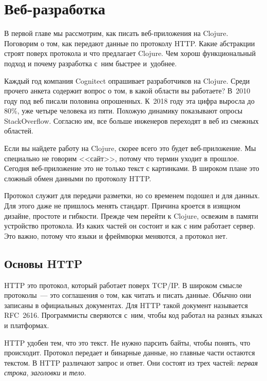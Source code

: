 \chapter{Веб-разработка}

\begin{teaser}
В первой главе мы рассмотрим, как писать веб-приложения на Clojure. Поговорим о
том, как передают данные по протоколу HTTP. Какие абстракции строят поверх
протокола и что предлагает Clojure. Чем хорош функциональный подход и почему
разработка с~ним быстрее и~удобнее.
\end{teaser}

Каждый год компания Cognitect
опрашивает
разработчиков на Clojure. Среди прочего анкета содержит вопрос о том, в какой
области вы работаете? В~2010 году под веб писали половина опрошенных. К~2018
году эта цифра выросла до 80\%, уже четыре человека из пяти. Похожую динамику
показывают опросы
StackOverflow. Согласно
им, все больше инженеров переходят в веб из смежных областей.

Если вы найдете работу на Clojure, скорее всего это будет веб-приложение. Мы
специально не говорим <<сайт>>, потому что термин уходит в прошлое. Сегодня
веб-приложение это не только текст с картинками. В широком плане это сложный
обмен данными по протоколу HTTP.

Протокол служит для передачи разметки, но со временем подошел и для данных. Для
этого даже не пришлось менять стандарт. Причина кроется в изящном дизайне,
простоте и гибкости. Прежде чем перейти к Clojure, освежим в памяти устройство
протокола. Из каких частей он состоит и как с ним работает сервер. Это важно,
потому что языки и фреймворки меняются, а протокол нет.

\section{Основы HTTP}

HTTP это протокол, который работает поверх TCP/IP. В широком смысле
протоколы~--- это соглашения о том, как читать и писать данные. Обычно они
записаны в официальных документах. Для HTTP такой документ называется
RFC~2616. Программисты
сверяются с~ним, чтобы код работал на разных языках и платформах.

HTTP удобен тем, что это текст. Не нужно парсить байты, чтобы понять, что
происходит. Протокол передает и бинарные данные, но главные части остаются
текстом. В HTTP различают запрос и ответ. Они состоят из трех частей:
\emph{первая строка}, \emph{заголовки} и \emph{тело}.

